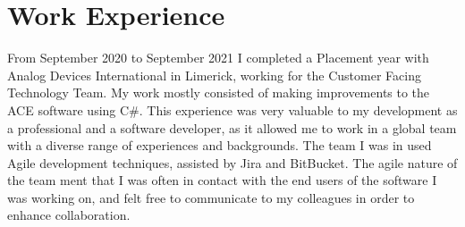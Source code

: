 \documentclass[]{twentysecondcv}
\begin{document}
\cvdate{\today}        %




\makeprofile

\section{Work Experience}
From September 2020 to September 2021 I completed a Placement year with Analog Devices International in Limerick, working for the Customer Facing Technology Team. My work mostly consisted of making improvements to the ACE software using C\#. This experience was very valuable to my development as a professional and a software developer, as it allowed me to work in a global team with a diverse range of experiences and backgrounds. The team I was in used Agile development techniques, assisted by Jira and BitBucket.
The agile nature of the team ment that I was often in contact with the end users of the software I was working on, and felt free to communicate to my colleagues in order to enhance collaboration.
\end{document}
